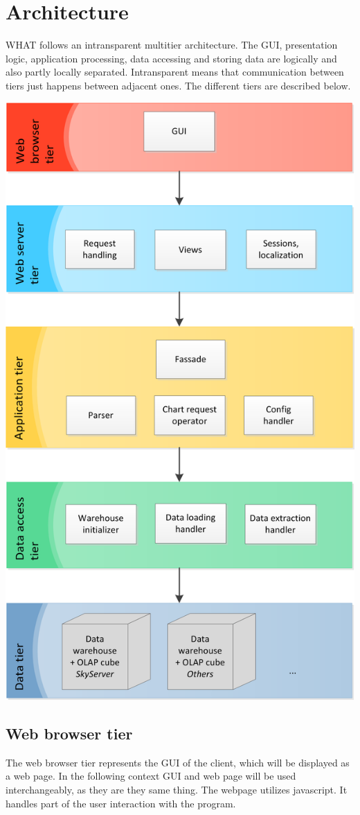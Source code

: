 \section{Architecture}

WHAT follows an intransparent multitier architecture. 
The GUI, presentation logic, application processing, data accessing and storing data
are logically and also partly locally separated. Intransparent means that communication
between tiers just happens between adjacent ones. The different tiers are described below.


\begin{center}
\includegraphics[width=0.6\linewidth]{Pictures/ArchiColor.png}
\end{center}   


\subsection{Web browser tier}
The web browser tier represents the GUI of the client, which will be displayed as a web page.
In the following context GUI and web page will be used interchangeably, as they are they same thing.
The webpage utilizes javascript.
It handles part of the user interaction with the program.

